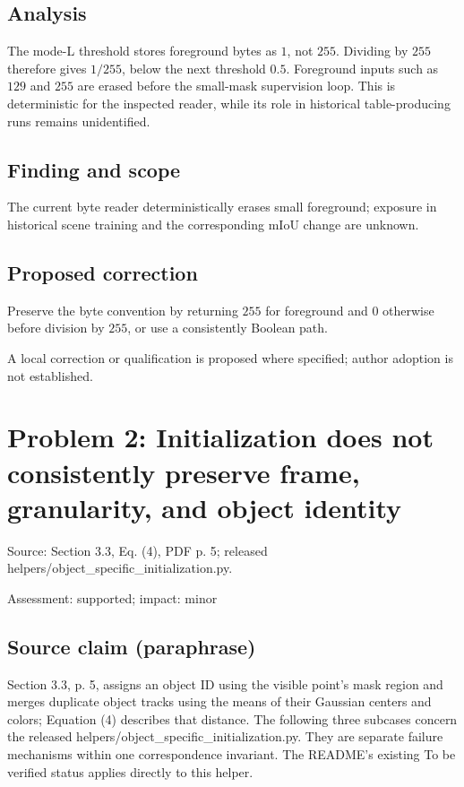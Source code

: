\documentclass[11pt]{article}
\begin{document}
\subsection*{Analysis}

The mode-L threshold stores foreground bytes as \(1\), not \(255\). Dividing by \(255\) therefore gives \(1/255\), below the next threshold \(0.5\). Foreground inputs such as \(129\) and \(255\) are erased before the small-mask supervision loop. This is deterministic for the inspected reader, while its role in historical table-producing runs remains unidentified.

\subsection*{Finding and scope}

The current byte reader deterministically erases small foreground; exposure in historical scene training and the corresponding mIoU change are unknown.

\subsection*{Proposed correction}

Preserve the byte convention by returning \(255\) for foreground and \(0\) otherwise before division by \(255\), or use a consistently Boolean path.

A local correction or qualification is proposed where specified; author adoption is not established.

\section*{Problem 2: Initialization does not consistently preserve frame, granularity, and object identity}

Source: Section 3.3, Eq. (4), PDF p. 5; released helpers/object\_specific\_initialization.py.

Assessment: supported; impact: minor

\subsection*{Source claim (paraphrase)}

Section 3.3, p. 5, assigns an object ID using the visible point’s mask region and merges duplicate object tracks using the means of their Gaussian centers and colors; Equation (4) describes that distance. The following three subcases concern the released helpers/object\_specific\_initialization.py. They are separate failure mechanisms within one correspondence invariant. The README’s existing To be verified status applies directly to this helper.
\end{document}
